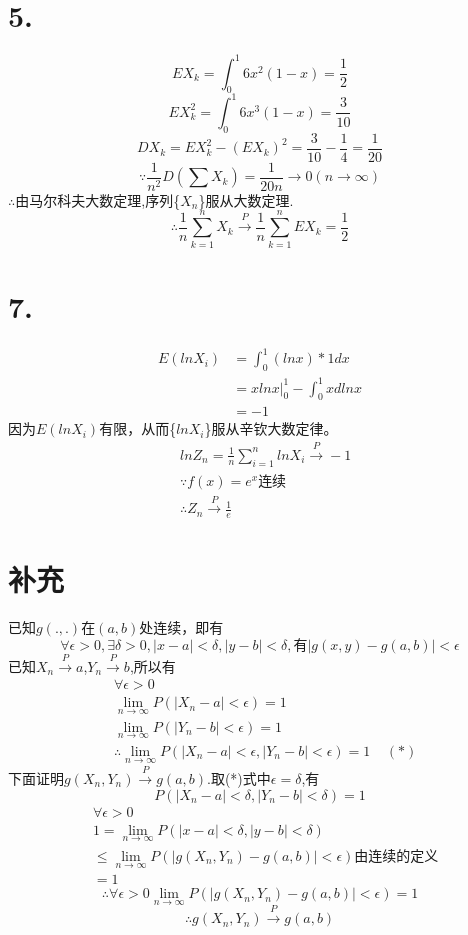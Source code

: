 \documentclass[a4paper,twocolumn]{ctexart}
\begin{document}
\section*{5.}
\[
EX_k=\int_{0}^{1}6x^2(1-x)=\frac{1}{2}
\]
\[
EX_k^2=\int_{0}^{1}6x^3(1-x)=\frac{3}{10}
\]
\[
DX_k=EX_k^2-(EX_k)^2=\frac{3}{10}-\frac{1}{4}=\frac{1}{20}
\]
\[
\because\frac{1}{n^2}D(\sum X_k)=\frac{1}{20n}\rightarrow 0 (n \rightarrow \infty)
\]
$\therefore$由马尔科夫大数定理,序列\{$X_n$\}服从大数定理.
\[
\therefore
\frac{1}{n}\sum_{k=1}^{n}X_k
\overset{P}{\rightarrow}\frac{1}{n}\sum_{k=1}^{n}EX_k=\frac{1}{2}
\]
\section*{7.}
\begin{align*}
E(lnX_i)&=\int_{0}^{1}(lnx)*1 dx\\
&=xlnx|_0^1-\int_{0}^{1}xdlnx\\
&=-1
\end{align*}
因为$E(lnX_i)$有限，从而\{$lnX_i$\}服从辛钦大数定律。\\
\begin{align*}
&lnZ_n=\frac{1}{n}\sum_{i=1}^{n}lnX_i\overset{P}{\to}-1\\
&\because f(x)=e^x\text{连续}\\
&\therefore Z_n\overset{P}{\to}\frac{1}{e}
\end{align*}

\section*{补充}
已知$g(.,.)$在$(a,b)$处连续，即有
\[
\forall \epsilon >0, \exists \delta >0,|x-a|<\delta,|y-b|<\delta,\text{有}|g(x,y)-g(a,b)|<\epsilon
\]
已知$X_n\overset{P}{\rightarrow}a$,$Y_n\overset{P}{\rightarrow}b$,所以有
\begin{align*}
&\forall \epsilon>0\\
&\lim_{n \to \infty} P(|X_n-a|<\epsilon)=1\\
&\lim_{n \to \infty} P(|Y_n-b|<\epsilon)=1\\
&\therefore\lim_{n \to \infty} P(|X_n-a|<\epsilon,|Y_n-b|<\epsilon)=1  ~~~~~(*)
\end{align*}
下面证明$g(X_n,Y_n)\overset{P}{\rightarrow}g(a,b)$.取(*)式中$\epsilon=\delta$,有
\[
P(|X_n-a|<\delta,|Y_n-b|<\delta)=1
\]
\begin{align*}
&\forall \epsilon >0\\
&1=\lim_{n \to \infty}P(|x-a|<\delta,|y-b|<\delta)\\
&\le
\lim_{n \to \infty} P(|g(X_n,Y_n)-g(a,b)|<\epsilon)\text{由连续的定义}\\
&=1
\end{align*}
\[
\therefore \forall \epsilon>0 \lim_{n \to \infty} P(|g(X_n,Y_n)-g(a,b)|<\epsilon)=1
\]
\[
\therefore g(X_n,Y_n)\overset{P}{\to}g(a,b)
\]
\end{document}
